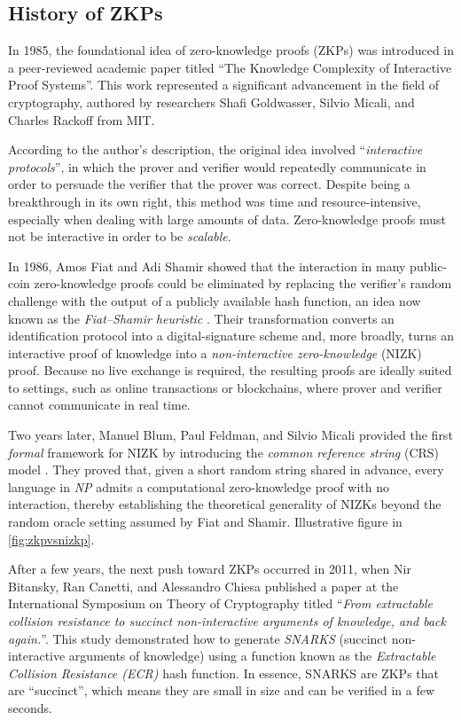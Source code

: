 \subsection{History of ZKPs}\label{zkHistory}

In 1985, the foundational idea of zero-knowledge proofs (ZKPs) was introduced in a peer-reviewed academic paper titled “The Knowledge Complexity of Interactive Proof Systems”\cite{MITzkstudy}. This work represented a significant advancement in the field of cryptography, authored by researchers Shafi Goldwasser, Silvio Micali, and Charles Rackoff from MIT.

According to the author's description, the original idea involved “\textit{interactive protocols}”, in which the prover and verifier would repeatedly communicate in order to persuade the verifier that the prover was correct.  Despite being a breakthrough in its own right, this method was time and resource-intensive, especially when dealing with large amounts of data.  Zero-knowledge proofs must not be interactive in order to be \textit{scalable}.

In 1986, Amos Fiat and Adi Shamir showed that the interaction in many public-coin zero-knowledge proofs could be eliminated by replacing the verifier's random challenge with the output of a publicly available hash function, an idea now known as the \textit{Fiat–Shamir heuristic} \cite{fiatShamirHeuristic}.  Their transformation converts an identification protocol into a digital-signature scheme and, more broadly, turns an interactive proof of knowledge into a \textit{non-interactive zero-knowledge} (NIZK) proof.  Because no live exchange is required, the resulting proofs are ideally suited to settings, such as online transactions or blockchains, where prover and verifier cannot communicate in real time.

Two years later, Manuel Blum, Paul Feldman, and Silvio Micali provided the first \textit{formal} framework for NIZK by introducing the \textit{common reference string} (CRS) model \cite{blumFeldmanMicali1988}.  They proved that, given a short random string shared in advance, every language in \textit{NP} admits a computational zero-knowledge proof with no interaction, thereby establishing the theoretical generality of NIZKs beyond the random oracle setting assumed by Fiat and Shamir. Illustrative figure in \ref{fig:zkpvsnizkp}.

After a few years, the next push toward ZKPs occurred in 2011, when Nir Bitansky, Ran Canetti, and Alessandro Chiesa published a paper at the International Symposium on Theory of Cryptography titled “\textit{From extractable collision resistance to succinct non-interactive arguments of knowledge, and back again.}”\cite{zksnark}.
This study demonstrated how to generate \textit{SNARKS} (succinct non-interactive arguments of knowledge) using a function known as the \textit{Extractable Collision Resistance (ECR)} hash function.  In essence, SNARKS are ZKPs that are “succinct”, which means they are small in size and can be verified in a few seconds.

